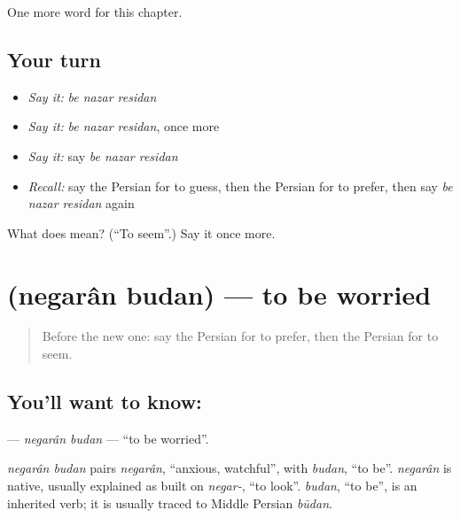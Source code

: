 \begin{grammarlens}[title={What you've built}]
One more word for this chapter.
\end{grammarlens}

\subsection*{Your turn}
\begin{itemize}
\raggedright
  \item \emph{Say it:} \emph{be nazar residan}
  \item \emph{Say it:} \emph{be nazar residan}, once more
  \item \emph{Say it:} say \emph{be nazar residan}
  \item \emph{Recall:} say the Persian for to guess, then the Persian for to prefer, then say \emph{be nazar residan} again
\end{itemize}

\begin{tcolorbox}[breakable,colback=teal!4,colframe=teal!35!black,title={Before you move on}]
What does    mean? (\textquotedblleft{}To seem\textquotedblright{}.) Say it once more.
\end{tcolorbox}
\section[\texorpdfstring{\fa{نگران} \fa{بودن} (negarân budan)}{نگران بودن (negarân budan)}]{  (negarân budan) — to be worried}

\label{lesson:FA-C146-negaran-budan}



\begin{quote}
Before the new one: say the Persian for to prefer, then the Persian for to seem.
\end{quote}

\subsection*{You'll want to know:  }
\textbf{ } — \emph{negarân budan} — \textquotedblleft{}to be worried\textquotedblright{}.

\begin{cousinweb}
\emph{negarân budan} pairs \emph{negarân}, \textquotedblleft{}anxious, watchful\textquotedblright{}, with \emph{budan}, \textquotedblleft{}to be\textquotedblright{}. \emph{negarân} is native, usually explained as built on \emph{negar-}, \textquotedblleft{}to look\textquotedblright{}. \emph{budan}, \textquotedblleft{}to be\textquotedblright{}, is an inherited verb; it is usually traced to Middle Persian \emph{būdan}.
\end{cousinweb}

